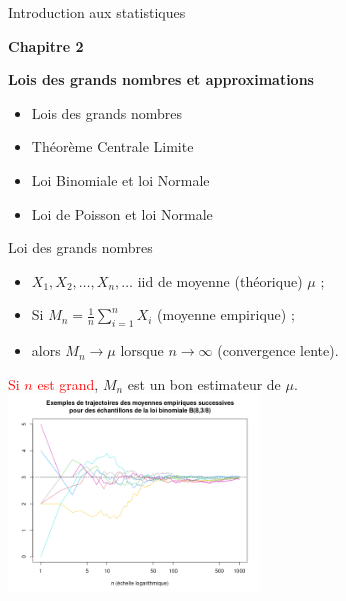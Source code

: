\documentclass{beamer}
\begin{document}

\begin{frame}{Introduction aux statistiques}


\begin{center}{\bf \Large Chapitre 2} \end{center}
\begin{center}{\bf \Large Lois des grands nombres et approximations} \end{center}
\vspace{0.3cm}
\begin{itemize}
\item Lois des grands nombres
\item Théorème Centrale Limite
\item Loi Binomiale et loi Normale
\item Loi de Poisson et loi Normale
\end{itemize}


\end{frame} 


\begin{frame}{Loi des grands nombres}

\begin{itemize}
\item  $X_1, X_2, \ldots, X_n, \ldots$ iid %
de moyenne (théorique) $\mu$ ;
\item Si $M_n=\frac{1}{n}\sum\limits_{i=1}^{n} X_i$ (moyenne empirique) ;
\item alors $M_n \to \mu$ lorsque $n\to\infty$ (convergence lente).
\end{itemize}
\begin{center}
  \textcolor{red}{Si $n$ est grand}, $M_n$ est un bon estimateur de $\mu$. \\
  \includegraphics[width=0.5\textwidth]{images/Rplot_trajectoires_moyenne_empirique.png}
\end{center}
\end{frame}
 
\end{document}
